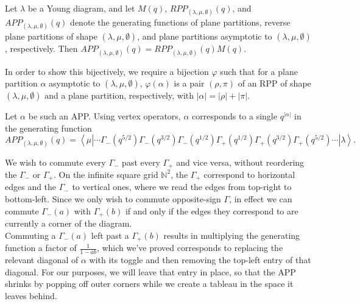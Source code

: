 





\begin{Theorem}
	Let $\lambda$ be a Young diagram, and let $M(q)$, $RPP_{(\lambda, \mu, \emptyset)}(q)$, and $APP_{(\lambda, \mu, \emptyset)}(q)$ denote the generating functions of plane partitions, reverse plane partitions of shape $(\lambda, \mu, \emptyset)$, and plane partitions asymptotic to $(\lambda, \mu, \emptyset)$, respectively. Then $APP_{(\lambda, \mu, \emptyset)}(q) = RPP_{(\lambda, \mu, \emptyset)}(q) M(q)$.
	
\end{Theorem}



\begin{Proof}
	In order to show this bijectively, we require a bijection $\varphi$ such that for a plane partition $\alpha$ asymptotic to $(\lambda, \mu, \emptyset)$, $\varphi(\alpha)$ is a pair $(\rho, \pi)$ of an RPP of shape $(\lambda, \mu, \emptyset)$ and a plane partition, respectively, with $|\alpha| = |\rho| + |\pi|$.
	
	Let $\alpha$ be such an APP. Using vertex operators, $\alpha$ corresponds to a single $q^{|\alpha|}$ in the generating function
	$$
		APP_{(\lambda, \mu, \emptyset)}(q) = \left< \mu \left| \cdots \Gamma_-\left(q^{5/2}\right) \Gamma_-\left(q^{3/2}\right) \Gamma_-\left(q^{1/2}\right) \Gamma_+\left(q^{1/2}\right) \Gamma_+\left(q^{3/2}\right) \Gamma_+\left(q^{5/2}\right) \cdots \right| \lambda \right>.
	$$
	
	We wish to commute every $\Gamma_-$ past every $\Gamma_+$ and vice versa, without reordering the $\Gamma_-$ or $\Gamma_+$. On the infinite square grid $\mathbb{N}^2$, the $\Gamma_+$ correspond to horizontal edges and the $\Gamma_-$ to vertical ones, where we read the edges from top-right to bottom-left. Since we only wish to commute opposite-sign $\Gamma$, in effect we can commute $\Gamma_-(a)$ with $\Gamma_+(b)$ if and only if the edges they correspond to are currently a corner of the diagram.\\
	
	Commuting a $\Gamma_-(a)$ left past a $\Gamma_+(b)$ results in multiplying the generating function a factor of $\frac{1}{1 - ab}$, which we've proved corresponds to replacing the relevant diagonal of $\alpha$ with its toggle and then removing the top-left entry of that diagonal. For our purposes, we will leave that entry in place, so that the APP shrinks by popping off outer corners while we create a tableau in the space it leaves behind.\\
	

\end{Proof}
